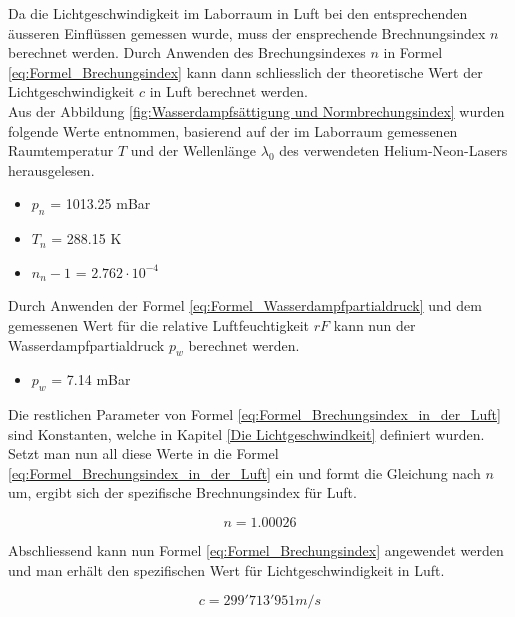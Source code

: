 Da die Lichtgeschwindigkeit im Laborraum in Luft bei den entsprechenden äusseren Einflüssen gemessen wurde, muss der ensprechende Brechnungsindex $n$ berechnet werden. Durch Anwenden des Brechungsindexes $n$ in Formel \ref{eq:Formel_Brechungsindex} kann dann schliesslich der theoretische Wert der Lichtgeschwindigkeit $c$ in Luft berechnet werden.\\[4mm]
Aus der Abbildung \ref{fig:Wasserdampfsättigung und Normbrechungsindex} wurden folgende Werte entnommen, basierend auf der im Laborraum gemessenen Raumtemperatur $T$ und der Wellenlänge $\lambda_{0}$ des verwendeten Helium-Neon-Lasers herausgelesen.

\begin{itemize}
\item $p_{n}$ = 1013.25 mBar
\item $T_{n}$ = 288.15 K
\item $n_{n}-1$ = $2.762\cdot10^{-4}$
\end{itemize}

Durch Anwenden der Formel \ref{eq:Formel_Wasserdampfpartialdruck} und dem gemessenen Wert für die relative Luftfeuchtigkeit $rF$ kann nun der Wasserdampfpartialdruck $p_{w}$ berechnet werden.

\begin{itemize}
\item $p_{w}$ = 7.14 mBar
\end{itemize}

Die restlichen Parameter von Formel \ref{eq:Formel_Brechungsindex_in_der_Luft} sind Konstanten, welche in Kapitel \ref{Die Lichtgeschwindkeit}  definiert wurden. Setzt man nun all diese Werte in die Formel \ref{eq:Formel_Brechungsindex_in_der_Luft} ein und formt die Gleichung nach $n$ um, ergibt sich der spezifische Brechnungsindex für Luft.

\begin{equation*}
n = 1.00026
\label{eq:Brechungsindex Wert in Luft}
\end{equation*}

Abschliessend kann nun Formel \ref{eq:Formel_Brechungsindex} angewendet werden und man erhält den spezifischen Wert für Lichtgeschwindigkeit in Luft.

\begin{equation*}
c = 299'713'951 m/s
\label{eq:Lichtgeschwindigkeit Wert in Luft}
\end{equation*}
